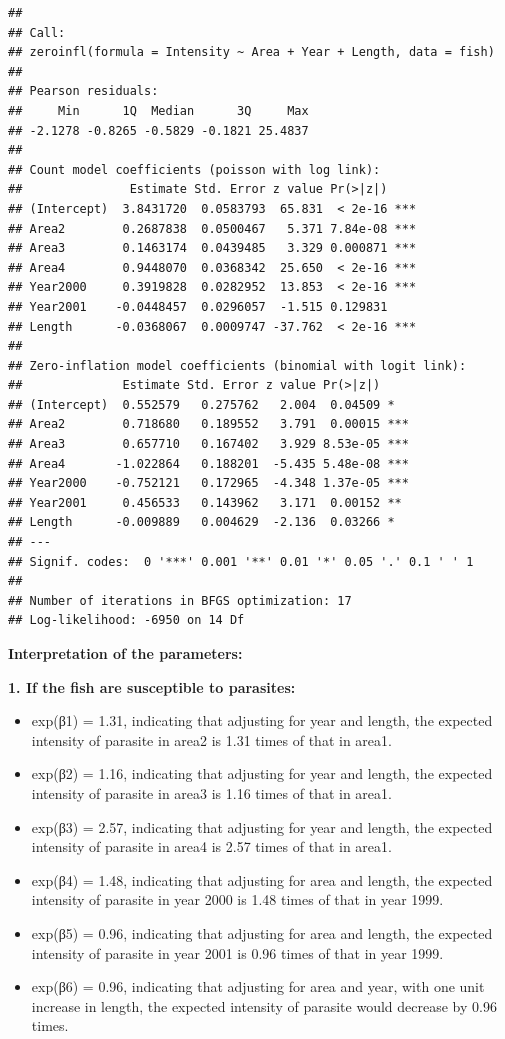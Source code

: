 \documentclass[
]{article}
\begin{document}
\begin{verbatim}
## 
## Call:
## zeroinfl(formula = Intensity ~ Area + Year + Length, data = fish)
## 
## Pearson residuals:
##     Min      1Q  Median      3Q     Max 
## -2.1278 -0.8265 -0.5829 -0.1821 25.4837 
## 
## Count model coefficients (poisson with log link):
##               Estimate Std. Error z value Pr(>|z|)    
## (Intercept)  3.8431720  0.0583793  65.831  < 2e-16 ***
## Area2        0.2687838  0.0500467   5.371 7.84e-08 ***
## Area3        0.1463174  0.0439485   3.329 0.000871 ***
## Area4        0.9448070  0.0368342  25.650  < 2e-16 ***
## Year2000     0.3919828  0.0282952  13.853  < 2e-16 ***
## Year2001    -0.0448457  0.0296057  -1.515 0.129831    
## Length      -0.0368067  0.0009747 -37.762  < 2e-16 ***
## 
## Zero-inflation model coefficients (binomial with logit link):
##              Estimate Std. Error z value Pr(>|z|)    
## (Intercept)  0.552579   0.275762   2.004  0.04509 *  
## Area2        0.718680   0.189552   3.791  0.00015 ***
## Area3        0.657710   0.167402   3.929 8.53e-05 ***
## Area4       -1.022864   0.188201  -5.435 5.48e-08 ***
## Year2000    -0.752121   0.172965  -4.348 1.37e-05 ***
## Year2001     0.456533   0.143962   3.171  0.00152 ** 
## Length      -0.009889   0.004629  -2.136  0.03266 *  
## ---
## Signif. codes:  0 '***' 0.001 '**' 0.01 '*' 0.05 '.' 0.1 ' ' 1 
## 
## Number of iterations in BFGS optimization: 17 
## Log-likelihood: -6950 on 14 Df
\end{verbatim}

\textbf{Interpretation of the parameters: }

\textbf{1. If the fish are susceptible to parasites:}

\begin{itemize}
\item
  exp(β1) = 1.31, indicating that adjusting for year and length, the
  expected intensity of parasite in area2 is 1.31 times of that in
  area1.
\item
  exp(β2) = 1.16, indicating that adjusting for year and length, the
  expected intensity of parasite in area3 is 1.16 times of that in
  area1.
\item
  exp(β3) = 2.57, indicating that adjusting for year and length, the
  expected intensity of parasite in area4 is 2.57 times of that in
  area1.
\item
  exp(β4) = 1.48, indicating that adjusting for area and length, the
  expected intensity of parasite in year 2000 is 1.48 times of that in
  year 1999.
\item
  exp(β5) = 0.96, indicating that adjusting for area and length, the
  expected intensity of parasite in year 2001 is 0.96 times of that in
  year 1999.
\item
  exp(β6) = 0.96, indicating that adjusting for area and year, with one
  unit increase in length, the expected intensity of parasite would
  decrease by 0.96 times.
\end{itemize}
\end{document}
